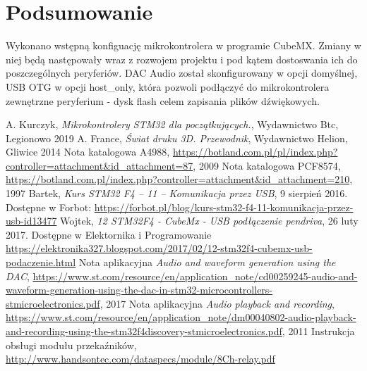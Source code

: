 \documentclass[10pt, a4paper]{article}
\begin{document}

\section{Podsumowanie}

Wykonano wstępną konfiguację mikrokontrolera w programie CubeMX. Zmiany w niej będą następowały wraz z rozwojem projektu i pod kątem dostoswania ich do poszczególnych peryferiów.
DAC Audio został skonfigurowany w opcji domyślnej, USB OTG w opcji host{\_}only, która pozwoli podłączyć do mikrokontrolera zewnętrzne peryferium - dysk flash celem zapisania plików dźwiękowych.


\newpage
%
%
\begin{thebibliography}{9}

    A. Kurczyk, \emph{Mikrokontrolery STM32 dla początkujących.}, Wydawnictwo Btc, Legionowo 2019
    A. France, \emph{Świat druku 3D. Przewodnik}, Wydawnictwo Helion, Gliwice 2014
    Nota katalogowa A4988, \url{https://botland.com.pl/pl/index.php?controller=attachment&id_attachment=87}, 2009
    Nota katalogowa PCF8574, \url{https://botland.com.pl/index.php?controller=attachment&id_attachment=210}, 1997
    Bartek, \emph{Kurs STM32 F4 – 11 – Komunikacja przez USB}, 9 sierpień 2016. Dostępne w Forbot: \url{https://forbot.pl/blog/kurs-stm32-f4-11-komunikacja-przez-usb-id13477}
    Wojtek, \emph{12 STM32F4 - CubeMx - USB podłączenie pendriva}, 26 luty 2017. Dostępne w Elektornika i Programowanie \url{https://elektronika327.blogspot.com/2017/02/12-stm32f4-cubemx-usb-podaczenie.html}
    Nota aplikacyjna \emph{Audio and waveform generation using the DAC}, \url{https://www.st.com/resource/en/application_note/cd00259245-audio-and-waveform-generation-using-the-dac-in-stm32-microcontrollers-stmicroelectronics.pdf}, 2017
    Nota aplikacyjna \emph{Audio playback and recording},
    \url{https://www.st.com/resource/en/application_note/dm00040802-audio-playback-and-recording-using-the-stm32f4discovery-stmicroelectronics.pdf}, 2011
    Instrukcja obsługi modułu przekaźników, \url{http://www.handsontec.com/dataspecs/module/8Ch-relay.pdf}
\end{thebibliography}
\end{document}

